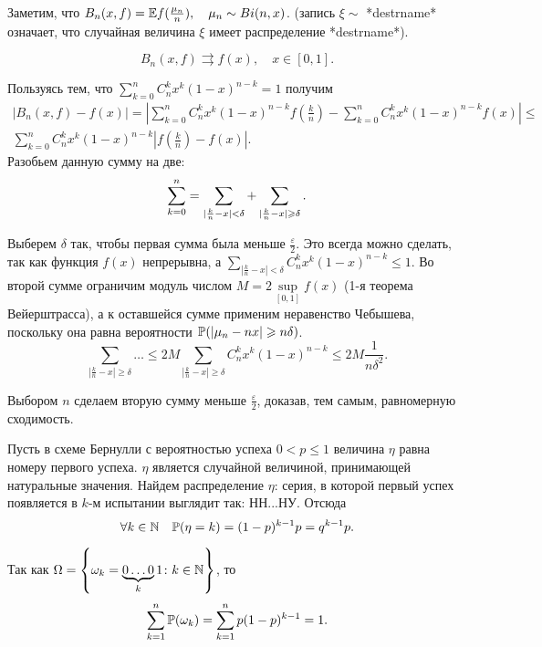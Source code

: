 \documentclass[../TV&MS.tex]{subfiles}
\begin{document}
	Заметим, что $B_n(x, f) = \mathbb{E} f(\frac{\mu_n}n),\quad  \mu_n \sim Bi(n, x)$. 
	(запись $\xi \sim$ *destrname*  означает, что случайная величина $\xi$ имеет 
	распределение *destrname*).

\begin{St}
	$$B_n(x, f) \rightrightarrows f(x), \quad x \in [0,1].$$
\end{St}

\begin{Proof}
	Пользуясь тем, что $\sum\limits_{k = 0}^nC_n^kx^k(1-x)^{n-k} = 1$ получим
\begin{multline*}
    |B_n(x, f) - f(x)| = \left|\sum\limits_{k = 0}^nC_n^kx^k(1-x)^{n-k}f
    \left(\frac{k}n\right) - \sum\limits_{k = 0}^nC_n^kx^k(1-x)^{n-k}f(x)\right| 
    \leqslant \\ \sum\limits_{k = 0}^nC_n^kx^k(1-x)^{n-k}
    \left|f\left(\frac{k}n\right) - f(x)\right|.
\end{multline*}
	Разобьем данную сумму на две:
	$$\sum\limits_{k = 0}^{n} = \sum\limits_{|\frac{k}n - x| < \delta} + 
	\sum\limits_{|\frac{k}n - x| \geqslant \delta}.$$
	
	Выберем $\delta$ так, чтобы первая сумма была меньше $\frac{\varepsilon}2$. 
	Это всегда можно сделать, так как функция $f(x)$ непрерывна, а 
	$\sum\limits_{|\frac{k}n - x| < \delta}C_n^kx^k(1-x)^{n-k} \leqslant 1$.
	Во второй сумме ограничим модуль числом $M = 2\sup\limits_{[0,1]} f(x)$ 
	(1-я теорема Вейерштрасса), а к оставшейся сумме применим неравенство Чебышева, 
	поскольку она равна вероятности $\mathbb{P}(|\mu_n - nx| \geqslant n\delta)$. 
	$$\sum\limits_{|\frac{k}n - x| \geqslant \delta}\ldots \leqslant 
	2M\sum\limits_{|\frac{k}n - x| \geqslant \delta}C_n^kx^k(1-x)^{n-k} 
	\leqslant 2M\frac1{n\delta^2}.$$
	
	Выбором $n$ сделаем вторую сумму меньше $\frac{\varepsilon}2$, 
	доказав, тем самым, равномерную сходимость.
\end{Proof}

	Пусть в схеме Бернулли с вероятностью успеха $0 < p \leqslant 1$ величина 
	$\eta$ равна номеру первого успеха. $\eta$ является случайной величиной, 
	принимающей натуральные значения. Найдем распределение $\eta$: серия, 
	в которой первый успех появляется в $k$-м испытании выглядит так: НН...НУ. Отсюда
	$$\forall k \in \mathbb{N} \quad \mathbb{P}(\eta = k) = (1-p)^{k-1}p = q^{k-1}p.$$
	
	Так как $\Omega = \left\{ \omega_k = \underbrace{0\ldots0}_k1 \colon k \in \mathbb{N} \right\}$, то 
	$$\sum\limits_{k = 1}^{n}\mathbb{P}(\omega_k) = \sum\limits_{k = 1}^{n} p(1-p)^{k-1} = 1.$$
\end{document}
